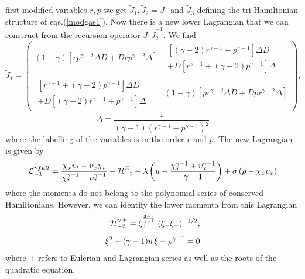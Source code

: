 \documentclass[a4paper,12pt]{article}
\begin{document}
first modified variables $r, p$ we get $\tilde{J}_1, \tilde{J}_2=
J_1$ and $\tilde{J}_3$ defining the tri-Hamiltonian structure of
eqs.(\ref{modgas1}). Now there is a new lower Lagrangian that we
can construct from the recursion operator $\tilde{J}_1
\tilde{J}_2^{-1}$. We find
\begin{equation}
\tilde{J}_1  = \left( \begin{array}{cc} (1-\gamma) \left[ r
p^{\gamma-2} \Delta D + D  r  p^{\gamma-2} \Delta \right] &
\begin{array}{c} \left[ (\gamma-2) r^{\gamma-1} + p^{\gamma-1}
\right] \Delta D \\ + D \left[
r^{\gamma-1} + (\gamma-2) p^{\gamma-1} \right]  \Delta  \end{array} \\
\begin{array}{c}
\left[ r^{\gamma-1} + (\gamma-2) p^{\gamma-1}  \right]  \Delta D\\
+ D \left[ (\gamma-2) r^{\gamma-1} + p^{\gamma-1} \right] \Delta
\end{array}
   & (1 - \gamma ) \left[ p r^{\gamma-2} \Delta D + D  p r^{\gamma-2}
   \Delta\right]
\end{array} \right), \label{jr}
\end{equation}
$$\Delta  \equiv \frac{1}{(\gamma-1) (r^{\gamma-1} -
p^{\gamma-1})^{2} } $$ where the labelling of the variables is in
the order $r$ and $p$. The new Lagrangian is given by
\begin{equation}
{\cal L}_{-1}^{\gamma full} =   \frac{\chi_x \upsilon_{t} -
\upsilon_{x} \chi_t}{ \chi_x^{\gamma-1} - \upsilon_x^{\gamma -1}}
- {\cal H}_{-1}^E +  \lambda \left( u - \frac{ \chi_x^{\gamma-1} +
\upsilon_x^{\gamma-1}}{\gamma-1} \right) + \sigma \left( \rho -
\chi_x \upsilon_x \right) \label{lowlaggas}
\end{equation}
where the momenta do not belong to the polynomial series of
conserved Hamiltonians. However, we can identify the lower momenta
from this Lagrangian
\begin{eqnarray} {\cal H}_{-2}^{\gamma \, \pm}
= \xi_{\pm}^{\frac{3-\gamma}{\gamma-1}} \; (
\xi_+ \xi_- )^{-1/2} , \nonumber \\[2mm]
\xi^2+ (\gamma-1) u \, \xi + \rho^{\gamma-1} = 0 \nonumber
\end{eqnarray}
where $\pm$ refers to Eulerian and Lagrangian series as well as
the roots of the quadratic equation.
\end{document}
